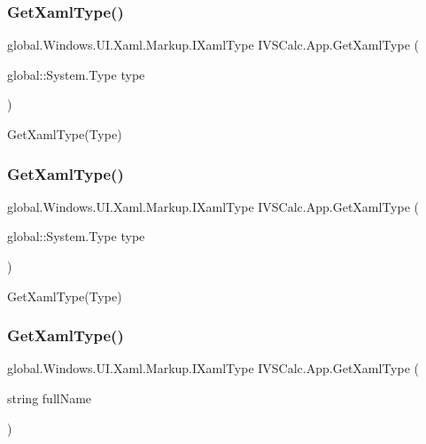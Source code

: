 \subsubsection{\texorpdfstring{Get\+Xaml\+Type()}{GetXamlType()}\hspace{0.1cm}{\footnotesize\ttfamily [4/10]}}
{\footnotesize\ttfamily global.\+Windows.\+U\+I.\+Xaml.\+Markup.\+I\+Xaml\+Type I\+V\+S\+Calc.\+App.\+Get\+Xaml\+Type (\begin{DoxyParamCaption}\item[{global\+::\+System.\+Type}]{type }\end{DoxyParamCaption})}



Get\+Xaml\+Type(\+Type) 

\mbox{\label{class_i_v_s_calc_1_1_app_aef34fbc14d2a7b2c647dd5e7b8252cb8}} 
\subsubsection{\texorpdfstring{Get\+Xaml\+Type()}{GetXamlType()}\hspace{0.1cm}{\footnotesize\ttfamily [5/10]}}
{\footnotesize\ttfamily global.\+Windows.\+U\+I.\+Xaml.\+Markup.\+I\+Xaml\+Type I\+V\+S\+Calc.\+App.\+Get\+Xaml\+Type (\begin{DoxyParamCaption}\item[{global\+::\+System.\+Type}]{type }\end{DoxyParamCaption})}



Get\+Xaml\+Type(\+Type) 

\mbox{\label{class_i_v_s_calc_1_1_app_a0ecb22e44dc1f88762844f47b18f2e7b}} 
\subsubsection{\texorpdfstring{Get\+Xaml\+Type()}{GetXamlType()}\hspace{0.1cm}{\footnotesize\ttfamily [6/10]}}
{\footnotesize\ttfamily global.\+Windows.\+U\+I.\+Xaml.\+Markup.\+I\+Xaml\+Type I\+V\+S\+Calc.\+App.\+Get\+Xaml\+Type (\begin{DoxyParamCaption}\item[{string}]{full\+Name }\end{DoxyParamCaption})}



